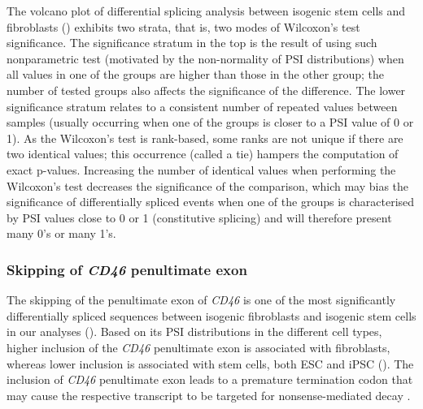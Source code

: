
The volcano plot of differential splicing analysis between isogenic stem cells and fibroblasts () exhibits two strata, that is, two modes of Wilcoxon’s test significance. The significance stratum in the top is the result of using such nonparametric test (motivated by the non-normality of PSI distributions) when all values in one of the groups are higher than those in the other group; the number of tested groups also affects the significance of the difference. The lower significance stratum relates to a consistent number of repeated values between samples (usually occurring when one of the groups is closer to a PSI value of 0 or 1). As the Wilcoxon’s test is rank-based, some ranks are not unique if there are two identical values; this occurrence (called a tie) hampers the computation of exact p-values. Increasing the number of identical values when performing the Wilcoxon’s test decreases the significance of the comparison, which may bias the significance of differentially spliced events when one of the groups is characterised by PSI values close to 0 or 1 (constitutive splicing) and will therefore present many 0's or many 1's.

\subsubsection{Skipping of \emph{CD46} penultimate exon}

The skipping of the penultimate exon of \emph{CD46} is one of the most significantly differentially spliced sequences between isogenic fibroblasts and isogenic stem cells in our analyses (). Based on its PSI distributions in the different cell types, higher inclusion of the \emph{CD46} penultimate exon is associated with fibroblasts, whereas lower inclusion is associated with stem cells, both ESC and iPSC (). The inclusion of \emph{CD46} penultimate exon leads to a premature termination codon that may cause the respective transcript to be targeted for nonsense-mediated decay \cite{warzecha:2010wi}.

